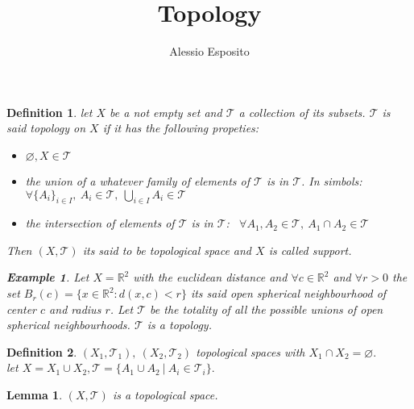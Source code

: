 \documentclass{article}
\title{Topology}
\author{Alessio Esposito}
\newtheorem{definition}{Definition}
\newtheorem{example}{Example}
\newtheorem{lemma}{Lemma}
\begin{document}
\maketitle
\begin{definition}
    let $X$ be a not empty set and $\mathcal{T}$ a collection of its subsets. $\mathcal{T}$ is said topology on $X$ if it has the following propeties:
    \begin{itemize}
        \item $\varnothing, X \in \mathcal{T}$
        \item the union of a whatever family of elements of $\mathcal{T}$ is in $\mathcal{T}$. In simbols: $\forall \{A_i \}_{i \in I}, \ A_i \in \mathcal{T}, \ \bigcup_{i \in I}A_i \in \mathcal{T}$  
        \item the intersection of elements of $\mathcal{T}$ is in $\mathcal{T}$: \ $\forall A_1, A_2 \in \mathcal{T}, \ A_1 \cap A_2 \in \mathcal{T} $ 
    \end{itemize}
Then $(X,\mathcal{T})$ its said to be topological space and $X$ is called support. 
\begin{example}
    Let $X = \mathbb{R}^2$ with the euclidean distance and $\forall c \in \mathbb{R}^2$ and $\forall r > 0$ the set $B_r(c) = \{ x \in \mathbb{R}^2 : d(x,c) < r \}$ its said open spherical neighbourhood of center $c$ and radius $r$.
    Let $\mathcal{T}$ be the totality of all the possible unions of open spherical neighbourhoods. $\mathcal{T}$ is a topology.

\end{example}
\end{definition}
\begin{definition}
    $(X_1, \mathcal{T}_1), \ (X_2, \mathcal{T}_2)$ topological spaces with $X_1 \cap X_2 = \varnothing.$ 
     \\ let $X = X_1 \cup X_2, \mathcal{T} = \{ A_1 \cup A_2 \ | \ A_i \in \mathcal{T}_i \}.$
\end{definition}
    \begin{lemma}
        $(X, \mathcal{T})$ is a topological space.
    \end{lemma}    
\end{document}
